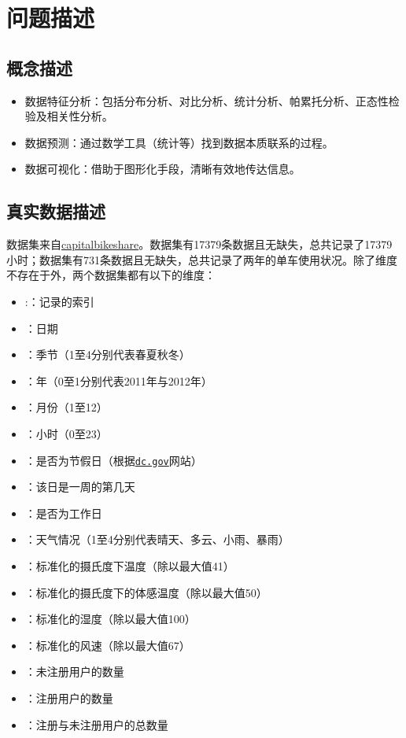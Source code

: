 \section{问题描述}
\subsection{概念描述}
\begin{itemize}
    \item 数据特征分析：包括分布分析、对比分析、统计分析、帕累托分析、正态性检验及相关性分析。
    \item 数据预测：通过数学工具（统计等）找到数据本质联系的过程。
    \item 数据可视化：借助于图形化手段，清晰有效地传达信息。
\end{itemize}


\subsection{真实数据描述}
数据集来自\href{http://capitalbikeshare.com/system-data}{capitalbikeshare}\cite{data}。数据集有17379条数据且无缺失，总共记录了17379小时；数据集有731条数据且无缺失，总共记录了两年的单车使用状况。除了维度不存在于外，两个数据集都有以下的维度：
\begin{itemize}
    \item {}:：记录的索引
    \item {}：日期
    \item {}：季节（1至4分别代表春夏秋冬）
    \item {}：年（0至1分别代表2011年与2012年）
    \item {}：月份（1至12）
    \item {}：小时（0至23）
    \item {}：是否为节假日（根据\href{http://dchr.dc.gov/page/holiday-schedule}{\texttt{dc.gov}}网站）
    \item {}：该日是一周的第几天
    \item {}：是否为工作日
    \item {}：天气情况（1至4分别代表晴天、多云、小雨、暴雨）
    \item {}：标准化的摄氏度下温度（除以最大值41）
    \item {}：标准化的摄氏度下的体感温度（除以最大值50）
    \item {}：标准化的湿度（除以最大值100）
    \item {}：标准化的风速（除以最大值67）
    \item {}：未注册用户的数量
    \item {}：注册用户的数量
    \item {}：注册与未注册用户的总数量
\end{itemize}

